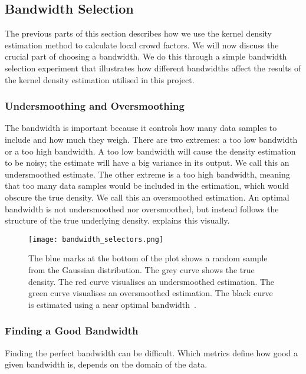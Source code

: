 \subsection{Bandwidth Selection}

The previous parts of this section describes how we use the kernel density estimation method to calculate local crowd factors. We will now discuss the crucial part of choosing a bandwidth. We do this through a simple bandwidth selection experiment that illustrates how different bandwidths affect the results of the kernel density estimation utilised in this project.

\subsubsection{Undersmoothing and Oversmoothing}

The bandwidth is important because it controls how many data samples to include and how much they weigh. There are two extremes: a too low bandwidth or a too high bandwidth. A too low bandwidth will cause the density estimation to be noisy; the estimate will have a big variance in its output. We call this an undersmoothed estimate. The other extreme is a too high bandwidth, meaning that too many data samples would be included in the estimation, which would obscure the true density. We call this an oversmoothed estimation. An optimal bandwidth is not undersmoothed nor oversmoothed, but instead follows the structure of the true underlying density.  explains this visually.

\begin{figure}[htbp]
\centering
    \texttt{[image: bandwidth\_selectors.png]}
    \caption[Undersmoothing/Oversmoothing explanation]{The blue marks at the bottom of the plot shows a random sample from the Gaussian distribution. The grey curve shows the true density. The red curve visualises an undersmoothed estimation. The green curve visualises an oversmoothed estimation. The black curve is estimated using a near optimal bandwidth~\cite{wiki:kernel_density_estimation}.}
    \label{fig:bandwidth_selectors}
\end{figure}

\subsubsection{Finding a Good Bandwidth}
Finding the perfect bandwidth can be difficult. Which metrics define how good a given bandwidth is, depends on the domain of the data.

